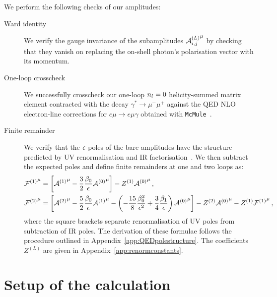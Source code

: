 \documentclass[main.tex]{subfiles}
\begin{document}
\smallskip

We perform the following checks of our amplitudes:
\begin{description}
    \item[Ward identity]
        We verify the gauge invariance of the subamplitudes ${\mathcal{A}^{(L)}_{i, j}}^{\mu}$ by checking that they vanish on replacing the on-shell photon's polarisation vector with its momentum.

    \item[One-loop crosscheck]
        We successfully crosscheck our one-loop $n_l=0$ helicity-summed matrix element contracted with the decay $\gamma^*\to\mu^-\mu^+$ against the QED NLO electron-line corrections for $e\mu\to e\mu\gamma$ obtained with \texttt{McMule}~\cite{Banerjee:2020rww,ulrich_yannick_2022_6046769}.

    \item[Finite remainder]
      We verify that the $\epsilon$-poles of the bare amplitudes have the structure predicted by UV renormalisation and IR factorisation~\cite{Catani:1998bh,Gardi:2009qi,Gardi:2009zv,Becher:2009cu,Becher:2009qa}. We then subtract the expected poles and define finite remainders at one and two loops as:
        \begin{subequations}
            \label{eqQED:finite-remainders}
            \begin{align}
                {\mathcal{F}^{(1)}}^\mu &= \left[ {\mathcal{A}^{(1)}}^{\mu} - \frac{3}{2}\frac{\beta_0}{\epsilon} {\mathcal{A}^{(0)}}^{\mu} \right] - Z^{(1)} {\mathcal{A}^{(0)}}^{\mu} \,,\\
                {\mathcal{F}^{(2)}}^\mu &= \left[ {\mathcal{A}^{(2)}}^{\mu} - \frac{5}{2}\frac{\beta_0}{\epsilon} {\mathcal{A}^{(1)}}^{\mu} - \left(-\frac{15}{8}\frac{\beta_0^2}{\epsilon^2}+\frac{3}{4}\frac{\beta_1}{\epsilon}\right) {\mathcal{A}^{(0)}}^{\mu} \right] - Z^{(2)} {\mathcal{A}^{(0)}}^{\mu} - Z^{(1)} {\mathcal{F}^{(1)}}^\mu \,,
            \end{align}
        \end{subequations}
        where the square brackets separate renormalisation of UV poles from subtraction of IR poles. The derivation of these formulae follows the procedure outlined in Appendix~\ref{app:QEDpolestructure}. The coefficients $Z^{(L)}$ are given in Appendix~\ref{app:renormconstants}.
\end{description}

\section{Setup of the calculation}
\label{secQED:calc}
\end{document}
